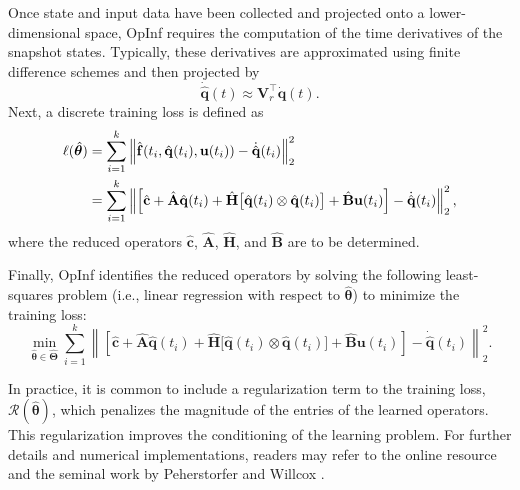 Once state and input data have been collected and projected onto a lower-dimensional space, OpInf requires the computation of the time derivatives of the snapshot states. Typically, these derivatives are approximated using finite difference schemes and then projected by\\
$$\dot{\hat{\mathbf{q}}}(t) \approx \mathbf{V}_r^{\top}\dot{\mathbf{q}}(t).$$
Next, a discrete training loss is defined as\\
\begin{align}
    \ell(\hat{\bm{\theta}}) &= \sum_{i=1}^{k} \left\| \hat{\mathbf{f}}(t_i, \hat{\mathbf{q}}(t_i), \mathbf{u}(t_i)) - \dot{\hat{\mathbf{q}}}(t_i) \right\|_2^2 \notag \\
    &= \sum_{i=1}^{k} \left\| \left[ \hat{\mathbf{c}} + \hat{\mathbf{A}}\hat{\mathbf{q}}(t_i) + \hat{\mathbf{H}}\bigl[ \hat{\mathbf{q}}(t_i) \otimes \hat{\mathbf{q}}(t_i) \bigr] + \hat{\mathbf{B}}\mathbf{u}(t_i) \right] - \dot{\hat{\mathbf{q}}}(t_i) \right\|_2^2,
    \label{loss_opinf}
\end{align}
where the reduced operators $\hat{\mathbf{c}}$, $\hat{\mathbf{A}}$, $\hat{\mathbf{H}}$, and $\hat{\mathbf{B}}$ are to be determined.

Finally, OpInf identifies the reduced operators by solving the following least-squares problem (i.e., linear regression with respect to \(\hat{\bm{\theta}}\)) to minimize the training loss:\\
\begin{equation}
    \min_{\hat{\bm{\theta}} \in \hat{\bm{\Theta}}} \sum_{i=1}^{k} \left\| \left[ \hat{\mathbf{c}} + \hat{\mathbf{A}}\hat{\mathbf{q}}(t_i) + \hat{\mathbf{H}}\bigl[ \hat{\mathbf{q}}(t_i) \otimes \hat{\mathbf{q}}(t_i) \bigr] + \hat{\mathbf{B}}\mathbf{u}(t_i) \right] - \dot{\hat{\mathbf{q}}}(t_i) \right\|_2^2.
    \label{eq:lst_opinf}
\end{equation}

In practice, it is common to include a regularization term to the training loss, $\mathcal{R}(\hat{\bm{\theta}})$, which penalizes the magnitude of the entries of the learned operators. This regularization improves the conditioning of the learning problem. For further details and numerical implementations, readers may refer to the online resource \cite{opinf2025} and the seminal work by Peherstorfer and Willcox \cite{peherstorfer2016data}.

